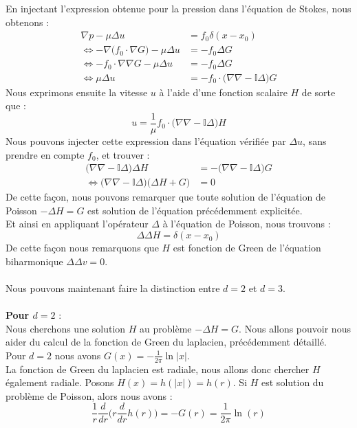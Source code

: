En injectant l'expression obtenue pour la pression dans l'équation de Stokes, nous obtenons :
\begin{align*}
    \nabla p - \mu \Delta u &= f_0 \delta(x-x_0) \\
    \Leftrightarrow - \nabla \bigg(f_0 \cdot \nabla G \bigg) - \mu \Delta u &= -f_0 \Delta G \\
    \Leftrightarrow - f_0 \cdot \nabla \nabla G - \mu \Delta u &= - f_0 \Delta G \\
    \Leftrightarrow \mu \Delta u &= - f_0 \cdot \big( \nabla \nabla - \mathbb{I} \Delta \big) G
\end{align*}
Nous exprimons ensuite la vitesse $u$ à l'aide d'une fonction scalaire $H$ de sorte que \cite{Pozrikidis} :
$$u = \frac{1}{\mu} f_0 \cdot \big( \nabla \nabla - \mathbb{I}\Delta \big)H $$
Nous pouvons injecter cette expression dans l'équation vérifiée par $\Delta u$, sans prendre en compte $f_0$, et trouver :
\begin{align*}
    \big( \nabla \nabla - \mathbb{I}\Delta \big)\Delta H &= - \big( \nabla \nabla - \mathbb{I} \Delta \big) G \\
    \Leftrightarrow \big( \nabla \nabla - \mathbb{I}\Delta \big) \bigg( \Delta H + G \bigg) &= 0
\end{align*}
De cette façon, nous pouvons remarquer que toute solution de l'équation de Poisson $ - \Delta H = G $ est solution de l'équation précédemment explicitée. \\
Et ainsi en appliquant l'opérateur $\Delta$ à l'équation de Poisson, nous trouvons :
$$ \Delta \Delta H = \delta(x-x_0) $$
De cette façon nous remarquons que $H$ est fonction de Green de l'équation biharmonique $\Delta \Delta v = 0$.\\
\\
Nous pouvons maintenant faire la distinction entre $d=2$ et $d=3$. \\
\\
\textbf{Pour $d = 2$} :\\
Nous cherchons une solution $H$ au problème $-\Delta H = G$. Nous allons pouvoir nous aider du calcul de la fonction de Green du laplacien, précédemment détaillé.\\
Pour $d=2$ nous avons $G(x) = -\frac{1}{2\pi} \ln |x|$.\\
La fonction de Green du laplacien est radiale, nous allons donc chercher $H$ également radiale. Posons $H(x) = h(|x|) = h(r)$.
Si $H$ est solution du problème de Poisson, alors nous avons :
$$ \frac{1}{r}\frac{d}{dr}\bigg( r \frac{d}{dr}h(r) \bigg) = - G(r) = \frac{1}{2\pi} \ln(r) $$
